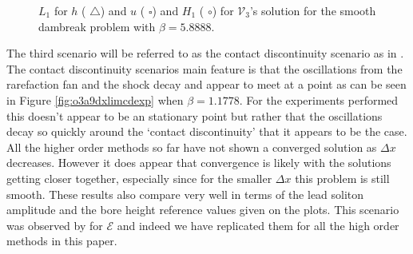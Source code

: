 \documentclass[SingleSpace,12pt,Journal]{Serre_ASCE}
\begin{document}
\begin{figure}
\centering
{}
\caption{$L_1$ for $h$ ({\color{red} $\triangle$}) and $u$ ({\color{blue} $\square$}) and $H_1$ ({\color{blue} $\circ$}) for $\mathcal{V}_3$'s solution for the smooth dambreak problem with $\beta = 5.8888$.}
\label{fig:o3a2dxlimmeasure}
\end{figure}

The third scenario will be referred to as the contact discontinuity scenario as in . The contact discontinuity scenarios main feature is that the oscillations from the rarefaction fan and the shock decay and appear to meet at a point as can be seen in Figure \ref{fig:o3a9dxlimcdexp} when $\beta = 1.1778$. For the experiments performed this doesn't appear to be an stationary point but rather that the oscillations decay so quickly around the `contact discontinuity' that it appears to be the case. All the higher order methods so far have not shown a converged solution as $\Delta x$ decreases. However it does appear that convergence is likely with the solutions getting closer together, especially since for the smaller $\Delta x$ this problem is still smooth. These results also compare very well in terms of the lead soliton amplitude and the bore height reference values given on the plots. This scenario was observed by  for $\mathcal{E}$ and indeed we have replicated them for all the high order methods in this paper.
\end{document}

